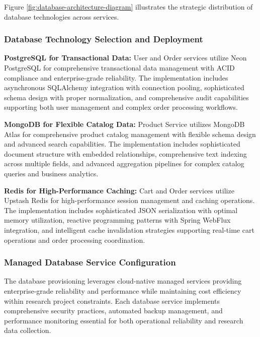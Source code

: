 Figure \ref{fig:database-architecture-diagram} illustrates the strategic distribution of database technologies across services.

\subsubsection{Database Technology Selection and Deployment}



\textbf{PostgreSQL for Transactional Data:}
User and Order services utilize Neon PostgreSQL for comprehensive transactional data management with ACID compliance and enterprise-grade reliability. The implementation includes asynchronous SQLAlchemy integration with connection pooling, sophisticated schema design with proper normalization, and comprehensive audit capabilities supporting both user management and complex order processing workflows.

\textbf{MongoDB for Flexible Catalog Data:}
Product Service utilizes MongoDB Atlas for comprehensive product catalog management with flexible schema design and advanced search capabilities. The implementation includes sophisticated document structure with embedded relationships, comprehensive text indexing across multiple fields, and advanced aggregation pipelines for complex catalog queries and business analytics.

\textbf{Redis for High-Performance Caching:}
Cart and Order services utilize Upstash Redis for high-performance session management and caching operations. The implementation includes sophisticated JSON serialization with optimal memory utilization, reactive programming patterns with Spring WebFlux integration, and intelligent cache invalidation strategies supporting real-time cart operations and order processing coordination.

\subsubsection{Managed Database Service Configuration}

The database provisioning leverages cloud-native managed services providing enterprise-grade reliability and performance while maintaining cost efficiency within research project constraints. Each database service implements comprehensive security practices, automated backup management, and performance monitoring essential for both operational reliability and research data collection.

